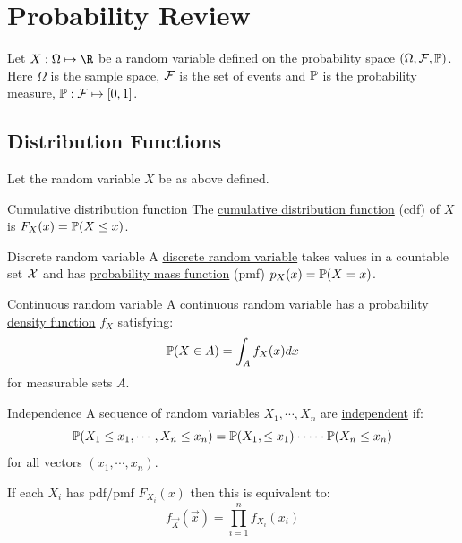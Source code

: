\documentclass[../Main.tex]{subfiles}
\begin{document}
\section{Probability Review}
Let $X : \Omega \mapsto \R$ be a random variable defined on the probability space $(\Omega, \F, \P)$. Here $\Omega$ is the sample space, $\F$ is the set of events and $\P$ is the probability measure, $\P : \F \mapsto [0, 1]$.
\subsection{Distribution Functions}
Let the random variable $X$ be as above defined.
\begin{definition}{Cumulative distribution function}
    The \underline{cumulative distribution function} (cdf) of $X$ is $F_X(x) = \P(X \leq x)$.
\end{definition}
\begin{definition}{Discrete random variable}
    A \underline{discrete random variable} takes values in a countable set $\samplespace$ and has \underline{probability mass function} (pmf) $p_X(x) = \P(X = x)$.
\end{definition}
\begin{definition}{Continuous random variable}
    A \underline{continuous random variable} has a \underline{probability density function} $f_X$ satisfying:
    \begin{equation*}
        \P(X \in A) = \int_A f_X(x) dx
    \end{equation*}
    for measurable sets $A$.
\end{definition}
\begin{definition}{Independence}
    A sequence of random variables $X_1, \cdots, X_n$ are \underline{independent} if:
    \begin{equation*}
        \P(X_1 \leq x_1, \cdots, X_n \leq x_n) = \P(X_1, \leq x_1) \cdot \cdots \cdot \P(X_n \leq x_n)
    \end{equation*}
    for all vectors $(x_1, \cdots, x_n)$.

    If each $X_i$ has pdf/pmf $F_{X_i}(x)$ then this is equivalent to:
    \begin{equation*}
        f_{\vec{X}}(\vec{x}) = \prod_{i=1}^{n} f_{X_i}(x_i)
    \end{equation*}
\end{definition}
\end{document}
